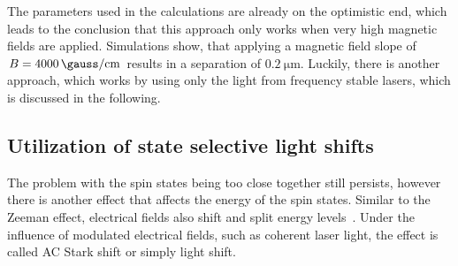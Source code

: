 The parameters used in the calculations are already on the optimistic end, which leads to the conclusion that this approach only works when very high magnetic fields are applied. Simulations show, that applying a magnetic field slope of $B=\SI{4000}{\gauss\per\centi\meter}$ results in a separation of $\SI{0.2}{\micro\meter}$. Luckily, there is another approach, which works by using only the light from frequency stable lasers, which is discussed in the following.

\begin{figure}[t]%
\end{figure}

\subsection{Utilization of state selective light shifts}

The problem with the spin states being too close together still persists, however there is another effect that affects the energy of the spin states. Similar to the Zeeman effect, electrical fields also shift and split energy levels~\cite{Voigt, Courtney1995}. Under the influence of modulated electrical fields, such as coherent laser light, the effect is called AC Stark shift or simply light shift.

